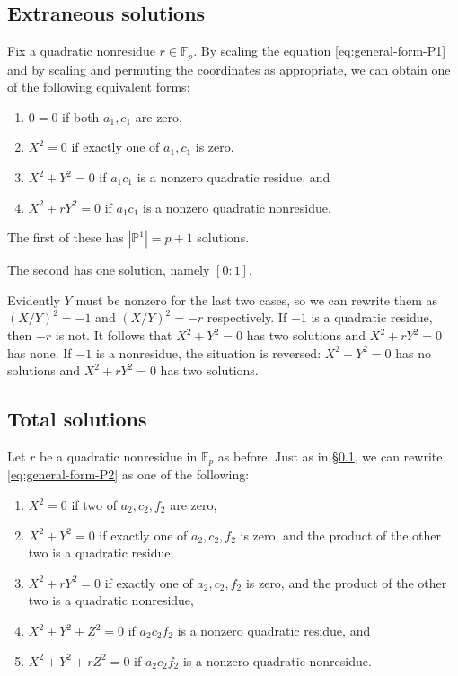 \documentclass[10pt,a4paper]{amsart}
\numberwithin{equation}{section}
\numberwithin{figure}{section}
\theoremstyle{definition}
\theoremstyle{remark}
\theoremstyle{plain}
\theoremstyle{plain}
\theoremstyle{definition}
\theoremstyle{plain}
\theoremstyle{plain}
\renewcommand{\P}{\mathbb{P}}
\newcommand{\F}{\mathbb{F}}
\begin{document}
    \subsection{Extraneous solutions}
    \label{subsec:counting-P1-solutions}

    Fix a quadratic nonresidue $r \in \F_p$. By scaling the equation
    \eqref{eq:general-form-P1} and by scaling and permuting the coordinates as
    appropriate, we can obtain one of the following equivalent forms:
    \begin{enumerate} 
        \item $0 = 0$ if both $a_1, c_1$ are zero, 
        \item $X^2 = 0$ if exactly one of $a_1, c_1$ is zero, 
        \item $X^2 + Y^2 = 0$ if $a_1 c_1$ is a nonzero quadratic residue, and
        \label{case:x^2+y^2=0} \item $X^2 + rY^2 = 0$ if $a_1 c_1$ is a nonzero 
        quadratic nonresidue.  
    \end{enumerate}

    The first of these has $|\P^1| = p+1$ solutions. 

    The second has one solution, namely $[0:1]$.

    Evidently $Y$ must be nonzero for the last two cases, so we can rewrite them as
    $(X/Y)^2 = -1$ and $(X/Y)^2 = -r$ respectively. If $-1$ is a quadratic residue,
    then $-r$ is not. It follows that $X^2 + Y^2 = 0$ has two solutions and $X^2 +
    rY^2 = 0$ has none. If $-1$ is a nonresidue, the situation is reversed: $X^2 +
    Y^2 = 0$ has no solutions and $X^2 + rY^2 = 0$ has two solutions.

    \subsection{Total solutions}
    \label{subsec:counting-P2-solutions}

    Let $r$ be a quadratic nonresidue in $\F_p$ as before. Just as in
    \S\ref{subsec:counting-P1-solutions}, we can rewrite \eqref{eq:general-form-P2}
    as one of the following: 
    \begin{enumerate} 
        \item $X^2 = 0$ if two of $a_2, c_2, f_2$ are zero, 
        \item $X^2 + Y^2 = 0$ if exactly one of $a_2, c_2, f_2$ is zero,
        and the product of the other two is a quadratic residue, 
        \item $X^2 + rY^2 = 0$ if exactly one of $a_2, c_2, f_2$ is zero, 
        and the product of the other two is a quadratic nonresidue, 
        \item $X^2 + Y^2 + Z^2 = 0$ if $a_2 c_2 f_2$ is a nonzero quadratic residue, and 
        \item $X^2 + Y^2 + rZ^2 = 0$ if $a_2 c_2 f_2$ is
        a nonzero quadratic nonresidue.  
    \end{enumerate}
\end{document}
